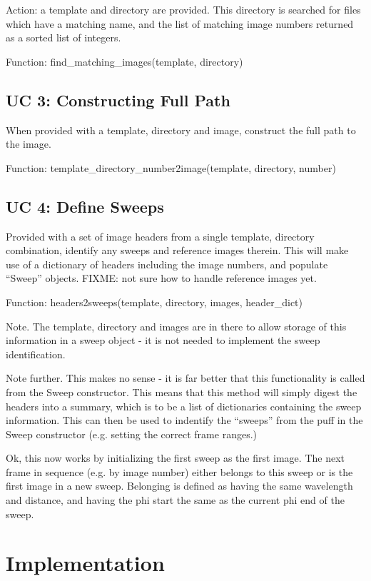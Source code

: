 \documentclass[a4paper, 11pt]{article}
\begin{document}
Action: a template and directory are provided. This directory is searched for
files which have a matching name, and the list of matching image numbers 
returned as a sorted list of integers.

Function: find\_matching\_images(template, directory)

\subsection{UC 3: Constructing Full Path}

When provided with a template, directory and image, construct the full path
to the image.

Function: template\_directory\_number2image(template, directory, number)

\subsection{UC 4: Define Sweeps}

Provided with a set of image headers from a single template, directory
combination, identify any sweeps and reference images therein. This will
make use of a dictionary of headers including the image numbers, and populate
``Sweep'' objects. FIXME: not sure how to handle reference images yet.

Function: headers2sweeps(template, directory, images, header_dict)

Note. The template, directory and images are in there to allow storage of
this information in a sweep object - it is not needed to implement the 
sweep identification.

Note further. This makes no sense - it is far better that this functionality
is called from the Sweep constructor. This means that this method will
simply digest the headers into a summary, which is to be a list of
dictionaries containing the sweep information. This can then be used to
indentify the ``sweeps'' from the puff in the Sweep constructor (e.g. setting
the correct frame ranges.)

Ok, this now works by initializing the first sweep as the first image. The
next frame in sequence (e.g. by image number) either belongs to this sweep
or is the first image in a new sweep. Belonging is defined as having the 
same wavelength and distance, and having the phi start the same as the 
current phi end of the sweep.

\section{Implementation}
\end{document}
